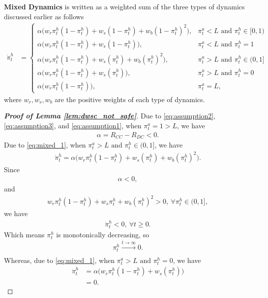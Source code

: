 \documentclass[letterpaper]{article} %
\begin{document}
\textbf{Mixed Dynamics} is written as a weighted sum of the three types of dynamics discussed earlier as follows
\begin{align}
     \dot{\pi}^h_t &=
	\begin{cases}
	       \alpha \bigg(w_r \pi^h_t(1-\pi^h_t) + w_s (1-\pi^h_t) + w_b (1-\pi_t^h)^2  \bigg) ,& \pi^a_t < L \text{ and } \pi_t^h \in [0,1) \\
		   \alpha \bigg(w_r \pi^h_t(1-\pi^h_t) + w_s (1-\pi^h_t) \bigg) ,& \pi^a_t < L \text{ and } \pi^h_t = 1 \\
	       \alpha \bigg(w_r \pi^h_t(1-\pi^h_t) + w_s (\pi^h_t) + w_b (\pi^h_t)^2  \bigg) ,&  \pi^a_t > L \text{ and } \pi_t^h \in (0,1]  \\
	       \alpha \bigg(w_r \pi^h_t(1-\pi^h_t) + w_s (\pi^h_t) \bigg) ,& \pi^a_t > L \text{ and } \pi^h_t = 0 \\
	       \alpha \bigg(w_r \pi^h_t(1-\pi^h_t) \bigg) ,&\pi^a_t = L,
	\end{cases} \label{eq:mixed_1}
\end{align}
where $w_r, w_s, w_b$ are the positive weights of each type of dynamics.

\begin{proof}[\textbf{Proof of Lemma \ref{lem:dwsc_not_safe}}]

Due to \eqref{eq:assumption2}, \eqref{eq:assumption3}, and \eqref{eq:assumption1}, when $\pi^a_t=1 > L$, we have
\begin{align}
    \alpha=R_{CC}-R_{DC}<0.
\end{align}
Due to \eqref{eq:mixed_1}, when $\pi^a_t > L \text{ and } \pi_t^h \in (0,1]$, we have
\begin{align}
    \dot{\pi}^h_t=\alpha \bigg(w_r \pi^h_t(1-\pi^h_t) + w_s (\pi^h_t) + w_b (\pi^h_t)^2  \bigg).
\end{align}
Since 
\begin{align}
    \alpha<0,
\end{align}
and
\begin{align}
    w_r \pi^h_t(1-\pi^h_t) + w_s \pi^h_t + w_b (\pi^h_t)^2>0,\ \forall \pi^h_t\in(0,1],
\end{align}
we have
\begin{align}
    \dot{\pi}^h_t<0,\ \forall t\geq 0.\label{eq:corr_result1}
\end{align}
Which means $\pi^h_t$ is monotonically decreasing, so
\begin{align}
    \pi^h_t\xrightarrow[]{t\rightarrow\infty} 0.
\end{align}
Whereas, due to \eqref{eq:mixed_1}, when $\pi^a_t > L \text{ and } \pi^h_t = 0$, we have
\begin{align}
    \dot{\pi}^h_t&=\alpha \bigg(w_r \pi^h_t(1-\pi^h_t) + w_s (\pi^h_t)\bigg) \\
    &= 0.
\end{align}
\end{proof}
\end{document}
